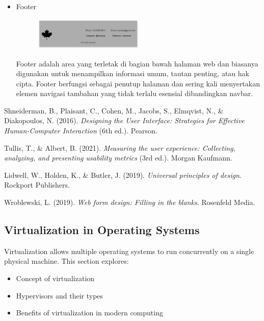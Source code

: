 \documentclass[12pt]{article}
\begin{document}
\begin{itemize}
    \item Footer
\begin{figure}[h] %
    \centering
    \includegraphics[width=0.5\textwidth]{asset/footer.png }
\end{figure}

    Footer adalah area yang terletak di bagian bawah halaman web dan biasanya digunakan untuk menampilkan informasi umum, tautan penting, atau hak cipta. Footer berfungsi sebagai penutup halaman dan sering kali menyertakan elemen navigasi tambahan yang tidak terlalu esensial dibandingkan navbar.

\end{itemize}

\begin{thebibliography}{9} 

Shneiderman, B., Plaisant, C., Cohen, M., Jacobs, S., Elmqvist, N., \& Diakopoulos, N. (2016). \textit{Designing the User Interface: Strategies for Effective Human-Computer Interaction} (6th ed.). Pearson.

Tullis, T., \& Albert, B. (2021). \textit{Measuring the user experience: Collecting, analyzing, and presenting usability metrics} (3rd ed.). Morgan Kaufmann.

Lidwell, W., Holden, K., \& Butler, J. (2019). \textit{Universal principles of design}. Rockport Publishers.

Wroblewski, L. (2019). \textit{Web form design: Filling in the blanks}. Rosenfeld Media.

			

\end{thebibliography}

\subsection{Virtualization in Operating Systems}
Virtualization allows multiple operating systems to run concurrently on a single physical machine. This section explores:
\begin{itemize}
    \item Concept of virtualization
    \item Hypervisors and their types
    \item Benefits of virtualization in modern computing
\end{itemize}
\end{document}
